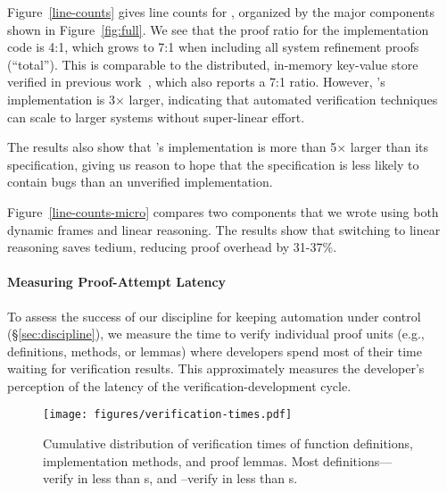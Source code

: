 
Figure~\ref{line-counts} gives line counts for \name, 
organized by the major components shown in Figure~\ref{fig:full}.
We see that the proof ratio for the implementation code
is 4:1, which grows to 7:1 %
when including all system refinement proofs (``total'').
This is comparable to the distributed, in-memory key-value store
verified in previous work~\cite{ironfleet},
which also reports a 7:1 ratio.
However, \name's implementation is 3$\times$ larger,
indicating that automated verification techniques can scale
to larger systems without super-linear effort.

The results also show that \name's implementation is 
more than 5$\times$ larger than its specification,
giving us reason to hope that the specification
is less likely to contain bugs than an unverified implementation.

Figure~\ref{line-counts-micro} 
compares two \name components that we wrote using
both dynamic frames and linear reasoning.
The results show that
switching to linear reasoning saves tedium,
reducing proof overhead by 31-37\%. 

\paragraph{Measuring Proof-Attempt Latency}\label{eval:discipline}
To assess the success
of our discipline for keeping automation under control (\S\ref{sec:discipline}),
we measure the time to verify individual proof
units (e.g., definitions, methods, or lemmas) 
where developers spend most of their time waiting for verification results.
This approximately measures the developer's perception of the 
latency of the verification-development cycle.

\begin{figure}
\texttt{[image: figures/verification-times.pdf]}
  \vspace{-5mm}
\caption{Cumulative distribution of verification times of function
  definitions, implementation methods, and proof lemmas. Most
  definitions--{\twentySecFasterPctile}--verify in less than {\twentySecSlowThresholdSecs}s,
  and {\tenSecFasterPctile}--verify in less than {\tenSecSlowThresholdSecs}s.
  }
  \vspace{-4mm}
\label{verification-times}
\end{figure}

